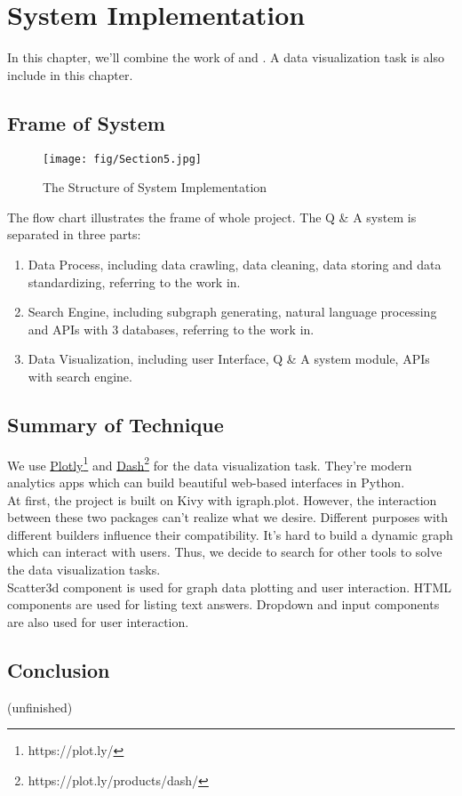 \chapter{System Implementation}
\label{Ch-5:Sec:System}

In this chapter, we'll combine the work of  and . A data visualization task is also include in this chapter. 

\section{Frame of System}

\begin{figure}
	\centering
	\texttt{[image: fig/Section5.jpg]}
	\caption{The Structure of System Implementation}
	\label{fig:section5-pic1}
\end{figure}

The flow chart  illustrates the frame of whole project. The Q \& A system is separated in three parts:
\begin{enumerate}
	\item Data Process, including data crawling, data cleaning, data storing and data standardizing, referring to the work in.
	\item Search Engine, including subgraph generating, natural language processing and APIs with 3 databases, referring to the work in.
	\item Data Visualization, including user Interface, Q \& A system module, APIs with search engine.
\end{enumerate}

\section{Summary of Technique}

We use \href{https://plot.ly/}{Plotly}\footnote{https://plot.ly/} and \href{https://plot.ly/products/dash/}{Dash}\footnote{https://plot.ly/products/dash/} for the data visualization task. They're modern analytics apps which can build beautiful web-based interfaces in Python. \\
At first, the project is built on Kivy with igraph.plot. However, the interaction between these two packages can't realize what we desire. Different purposes with different builders influence their compatibility. It's hard to build a dynamic graph which can interact with users. Thus, we decide to search for other tools to solve the data visualization tasks.\\
Scatter3d component is used for graph data plotting and user interaction. HTML components are used for listing text answers. Dropdown and input components are also used for user interaction.

\section{Conclusion}
(unfinished)